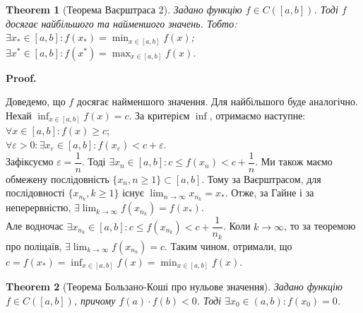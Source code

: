 \documentclass[a4paper, 14pt]{article}
\makeatletter
\def\qed{$\blacksquare$}
\theoremstyle{theoremdd}
\newtheorem{theorem}{Theorem}[subsection]
\theoremstyle{theoremdd}
\theoremstyle{theoremdd}
\theoremstyle{theoremdd}
\theoremstyle{theoremdd}
\theoremstyle{theoremdd}
\theoremstyle{theoremdd}
\theoremstyle{theoremdd}
\renewenvironment{proof}[1][Proof.\\]{\par
\pushQED{\hfill \qed}%
\normalfont \topsep6\p@\@plus6\p@\relax
\trivlist
\item\relax
{\bfseries
#1\@addpunct{.}}\hspace\labelsep\ignorespaces
}{%
\popQED\endtrivlist\@endpefalse
}
\makeatother
\begin{document}
\begin{theorem}[Теорема Ваєрштраса 2]
Задано функцію $f \in C([a,b])$. Тоді $f$ досягає найбільшого та найменшого значень. Тобто:\\
$\displaystyle \exists x_* \in [a,b]: f(x_*) = \min_{x \in [a,b]} f(x)$;\\
$\displaystyle \exists x^* \in [a,b]: f(x^*) = \max_{x \in [a,b]} f(x)$.
\end{theorem}

\begin{proof}
Доведемо, що $f$ досягає найменшого значення. Для найбільшого буде аналогічно.\\
Нехай $\displaystyle \inf_{x \in [a,b]} f(x) = c$. За критерієм $\inf$, отримаємо наступне:\\
$\forall x \in [a,b]: f(x) \geq c$;\\
$\forall \varepsilon > 0: \exists x_{\varepsilon} \in [a,b]: f(x_{\varepsilon}) < c + \varepsilon$.\\
Зафіксуємо $\varepsilon = \dfrac{1}{n}$. Тоді $\exists x_n \in [a,b]: c \leq f(x_n) < c + \dfrac{1}{n}$. Ми також маємо обмежену послідовність $\{x_n, n \geq 1\} \subset [a,b]$. Тому за Ваєрштрасом, для послідовності $\{x_{n_k},k \geq 1\}$ існує $\displaystyle \lim_{n \to \infty} x_{n_k} = x_*$. Отже, за Гайне і за неперервністю, $\displaystyle \exists \lim_{k \to \infty} f(x_{n_k}) = f(x_*)$.\\
Але водночас $\exists x_{n_k} \in [a,b]: c \leq f(x_{n_k}) < c + \dfrac{1}{n_k}$. Коли $k \to \infty$, то за теоремою про поліцаїв, $\exists \displaystyle \lim_{k \to \infty} f(x_{n_k}) = c$. Таким чином, отримали, що $c = f(x_*) = \displaystyle \inf_{x \in [a,b]} f(x) = \min_{x \in [a,b]} f(x)$.
\end{proof}

\begin{theorem}[Теорема Бользано-Коші про нульове значення]
Задано функцію $f \in C([a,b])$, причому $f(a) \cdot f(b) < 0$. Тоді $\exists x_0 \in (a,b): f(x_0) = 0$.
\\ \iffalse %
\begin{figure}[H]
\centering
\begin{tikzpicture}
\draw[thick,->] (-0.5,0)--(4.5,0) node[anchor=north west] {$x$};
\draw[thick,->] (0,-1.5)--(0,2.5) node[anchor=east] {$y$};
\draw [thick] plot [smooth] coordinates {(0.5,-1) (1,-0.5) (1.2,-1.2) (1.8,0.5) (2.5,-0.3) (4, 2)} node[anchor = south] {$f(x)$};
\draw [dashed] (4,2)--(0,2) node[anchor = east] {$f(b)$};
\draw [dashed] (0.5,-1)--(0,-1) node[anchor = east] {$f(a)$};
\fill[red] (2.76,0) circle (1pt) node[black, scale = 0.8] at (2.796,-0.3) {$x_0$};
\end{tikzpicture}
\caption*{В цьому випадку $f(a) < 0, f(b) > 0$}
\end{figure}
\fi %
\end{theorem}
\end{document}
